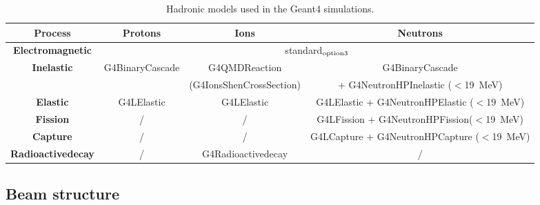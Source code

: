 
\begin{table}
\label{physlist_ion}
\caption{Hadronic models used in the Geant4 simulations.}
\begin{scriptsize}
\begin{center}
\renewcommand{\arraystretch}{1.2}
\begin{tabular} {cccc}\hline
\textbf{Process} & \textbf{Protons} & \textbf{Ions} & \textbf{Neutrons} \\ \hline 
\textbf{Electromagnetic} & \multicolumn{3}{c}{standard$_{\rm{option3}}$} \\ %
\textbf{Inelastic} & G4BinaryCascade & G4QMDReaction  &  G4BinaryCascade  \\ 
 & & (G4IonsShenCrossSection)&+ G4NeutronHPInelastic ($<$19~MeV)\\ %
\textbf{Elastic} & G4LElastic & G4LElastic & G4LElastic + G4NeutronHPElastic ($<$19~MeV)\\ %
\textbf{Fission} & / & / & G4LFission + G4NeutronHPFission($<$19~MeV) \\ %
\textbf{Capture} & / & / & G4LCapture +  G4NeutronHPCapture ($<$19~MeV) \\ %
\textbf{Radioactivedecay} & / & G4Radioactivedecay & / \\ \hline
\end{tabular}
\end{center}
\end{scriptsize}
\label{table:table_modele_physic_CC_simulation_Hadronth}
\end{table}


\subsection{Beam structure}
\label{subsection:modelisation_fasceau_ions_CC_hadrontherapy_Geant4}
